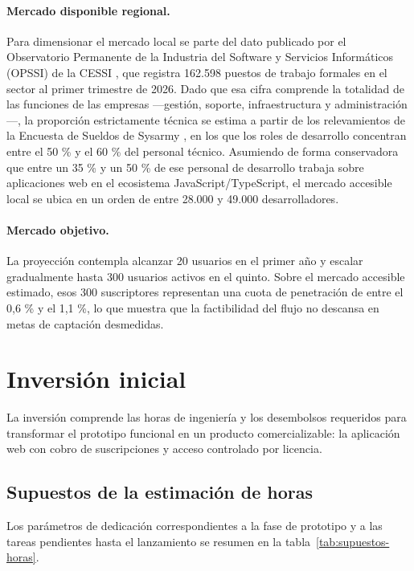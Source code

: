 \paragraph{Mercado disponible regional.} Para dimensionar el mercado local se parte del dato publicado por el Observatorio Permanente de la Industria del Software y Servicios Informáticos (OPSSI) de la CESSI \citep{cessiopssi}, que registra 162.598 puestos de trabajo formales en el sector al primer trimestre de 2026. Dado que esa cifra comprende la totalidad de las funciones de las empresas —gestión, soporte, infraestructura y administración—, la proporción estrictamente técnica se estima a partir de los relevamientos de la Encuesta de Sueldos de Sysarmy \citep{openqube}, en los que los roles de desarrollo concentran entre el 50 \% y el 60 \% del personal técnico. Asumiendo de forma conservadora que entre un 35 \% y un 50 \% de ese personal de desarrollo trabaja sobre aplicaciones web en el ecosistema JavaScript/TypeScript, el mercado accesible local se ubica en un orden de entre 28.000 y 49.000 desarrolladores.

\paragraph{Mercado objetivo.} La proyección contempla alcanzar 20 usuarios en el primer año y escalar gradualmente hasta 300 usuarios activos en el quinto. Sobre el mercado accesible estimado, esos 300 suscriptores representan una cuota de penetración de entre el 0,6 \% y el 1,1 \%, lo que muestra que la factibilidad del flujo no descansa en metas de captación desmedidas.

\section{Inversión inicial}\label{sec:n5.2}

La inversión comprende las horas de ingeniería y los desembolsos requeridos para transformar el prototipo funcional en un producto comercializable: la aplicación web con cobro de suscripciones y acceso controlado por licencia.

\subsection{Supuestos de la estimación de horas}\label{sec:n5.2.1}

Los parámetros de dedicación correspondientes a la fase de prototipo y a las tareas pendientes hasta el lanzamiento se resumen en la tabla~\ref{tab:supuestos-horas}.

